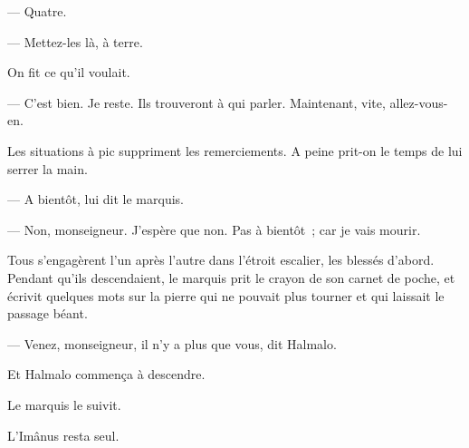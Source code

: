 \documentclass[french,twoside]{book} %
\begin{document}
 — Quatre.\par
— Mettez-les là, à terre.\par
On fit ce qu’il voulait.\par
— C’est bien. Je reste. Ils trouveront à qui parler. Maintenant, vite, allez-vous-en.\par
Les situations à pic suppriment les remerciements. A peine prit-on le temps de lui serrer la main.\par
— A bientôt, lui dit le marquis.\par
— Non, monseigneur. J’espère que non. Pas à bientôt ; car je vais mourir.\par
Tous s’engagèrent l’un après l’autre dans l’étroit escalier, les blessés d’abord. Pendant qu’ils descendaient, le marquis prit le crayon de son carnet de poche, et écrivit quelques mots sur la pierre qui ne pouvait plus tourner et qui laissait le passage béant.\par
— Venez, monseigneur, il n’y a plus que vous, dit Halmalo.\par
Et Halmalo commença à descendre.\par
Le marquis le suivit.\par
L’Imânus resta seul.
\end{document}
